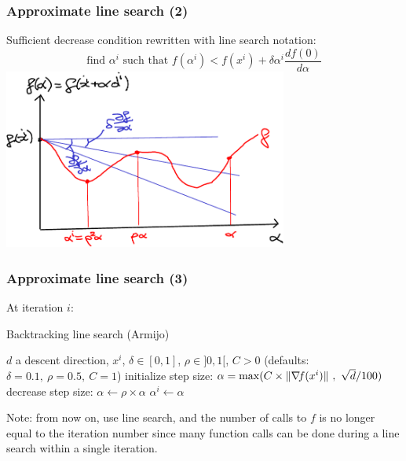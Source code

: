 \documentclass[12pt]{beamer}
\begin{document}
\begin{frame}
\frametitle{Approximate line search (2)} 
Sufficient decrease condition rewritten with line search notation:
\begin{equation*}
\text{find } \alpha^i \text{ such that } f(\alpha^i) < f(x^i) + \delta \alpha^i \frac{d f(0)}{d \alpha}
\end{equation*}
\centering
\includegraphics[width=0.7\textwidth]{line_search_backtrack-crop.pdf} 
\end{frame}

\begin{frame}
\frametitle{Approximate line search (3)} 
At iteration $i$:
\begin{block}{Backtracking line search (Armijo)}
\begin{algorithmic}
\REQUIRE $d$ a descent direction, $x^i$, $\delta \in [0,1]$, $\rho \in ]0,1[$, $C>0$
\STATE (defaults: $\delta=0.1,~\rho=0.5,~C=1$)
\STATE initialize step size: $\alpha = \max(C \times \lVert \nabla\!{f}(x^i) \rVert ~,~ \sqrt{d}/100) $ 
\STATE decrease step size: $\alpha \leftarrow \rho \times \alpha$
\ENDWHILE 
\RETURN $\alpha^i \leftarrow \alpha$
\end{algorithmic}
\end{block}
Note: from now on, use line search, and the number of calls to $f$ is no longer equal to the iteration number since many function calls can be done during a line search within a single iteration.
\end{frame}
\end{document}
